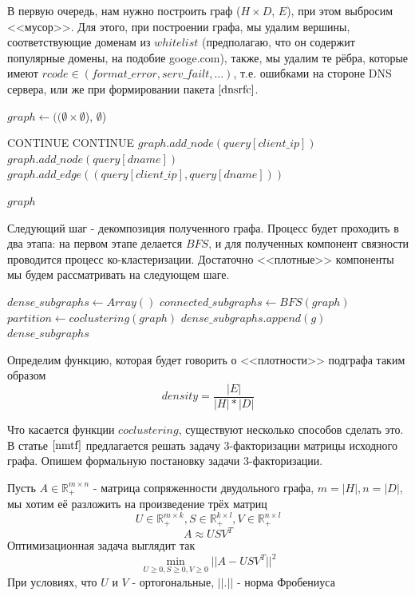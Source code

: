 \documentclass[14pt]{extreport} %
\begin{document}
В первую очередь, нам нужно построить граф ($H \times D$, $E$), при этом выбросим <<мусор>>. Для этого, при построении графа, мы удалим вершины, соответствующие доменам из $whitelist$ (предполагаю, что он содержит популярные домены, на подобие googe.com), также, мы удалим те рёбра, которые имеют $rcode \in (format\_error, serv\_failt, ...)$, т.е. ошибками на стороне DNS сервера, или же при формировании пакета $\cite{dnsrfc}$.
\\
\begin{algorithmic}
	\State $graph \gets ((\emptyset \times \emptyset$), $\emptyset$)
		
	\State CONTINUE
	\EndIf
	\State CONTINUE
	\EndIf
	\State $graph.add\_node(query[client\_ip])$
	\State $graph.add\_node(query[dname])$
	\State $graph.add\_edge((query[client\_ip], query[dname]))$
				
	\EndFor
	\State \Return $graph$
	\EndFunction
\end{algorithmic}
	
	
Следующий шаг - декомпозиция полученного графа. Процесс будет проходить в два этапа: на первом этапе делается $BFS$, и для полученных компонент связности проводится процесс ко-кластеризации. Достаточно <<плотные>> компоненты мы будем рассматривать на следующем шаге.
\begin{algorithmic}
	\State $dense\_subgraphs\gets Array()$
	\State $connected\_subgraphs\gets BFS(graph)$
	\State $partition \gets coclustering(graph)$
	\State $dense\_subgraphs.append(g)$
	\EndIf
	\EndFor
	\EndFor
	\State \Return $dense\_subgraphs$
	\EndFunction
\end{algorithmic}
	
Определим функцию, которая будет говорить о <<плотности>> подграфа таким образом
$$density = \frac{|E|}{|H|*|D|}$$
	
Что касается функции $coclustering$, существуют несколько способов сделать это. В статье $\cite{nmtf}$ предлагается решать задачу 3-факторизации матрицы исходного графа. Опишем формальную постановку задачи 3-факторизации.
	
Пусть $A \in \mathbb{R}_{+}^{m \times n}$ - матрица сопряженности двудольного графа,  $m = |H|, n = |D|$, мы хотим её разложить на произведение трёх матриц $$ U \in \mathbb{R}_{+}^{m \times k}, S \in \mathbb{R}_{+}^{k \times l}, V \in  \mathbb{R}_{+}^{n \times l}$$
$$ A \approx USV^T$$
Оптимизационная задача выглядит так
$$\min_{U \ge 0, S \ge 0, V \ge 0}{|| A - USV^T||^2}$$
При условиях, что  $U$ и $V$  - ортогональные, $||.||$ - норма Фробениуса
	
\end{document}
